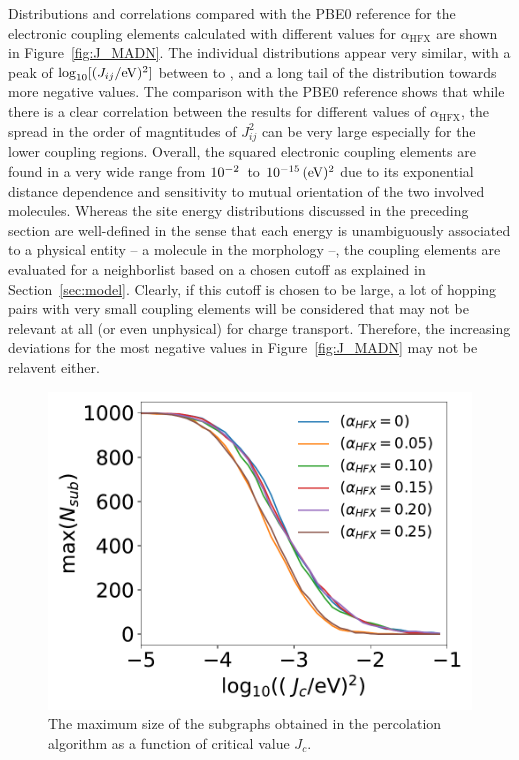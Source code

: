 \documentclass[%
 reprint,
superscriptaddress,
 amsmath,amssymb,
 aps,
prb,
floatfix
]{revtex4-2}
\newcommand{\bjoern}[2]{{\color{blue}{{\bf #1} #2}}}
\newcommand{\ahfx}{\ensuremath{\alpha_\text{HFX}}\xspace}
\begin{document}
Distributions and correlations compared with the PBE0 reference for the electronic coupling elements calculated with different values for \ahfx are shown in Figure~\ref{fig:J_MADN}. The individual distributions appear very similar, with a peak of $\log_{10}[(J_{ij}/\unit[]{eV})^2]$ between \unit[-5]{} to \unit[-6]{}, and a long tail of the distribution towards more negative values. The comparison with the PBE0 reference shows that while there is a clear correlation between the results for different values of \ahfx, the spread in the order of magntitudes of $J_{ij}^2$ can be very large especially for the lower coupling regions. Overall, the squared electronic coupling elements are found in a very wide range from $\unit[10^{-2}]{}$ to $\unit[10^{-15}]{(eV)^2}$ due to its exponential distance dependence and sensitivity to mutual orientation of the two involved molecules. Whereas the site energy distributions discussed in the preceding section are well-defined in the sense that each energy is unambiguously associated to a physical entity -- a molecule in the morphology --, the coupling elements are evaluated for a neighborlist based on a chosen cutoff as explained in Section~\ref{sec:model}.\bjoern{TODO:}{add!} Clearly, if this cutoff is chosen to be large, a lot of hopping pairs with very small coupling elements will be considered that may not be relevant at all (or even unphysical) for charge transport. Therefore, the increasing deviations for the most negative values in Figure~\ref{fig:J_MADN} may not be relavent either. 

\begin{figure}[tbp]
  \centering
  \includegraphics[width=\linewidth]{figs/fig_network_all.pdf}
  \caption{The maximum size of the subgraphs obtained in the percolation algorithm as a function of critical value $J_c$.}
  \label{fig:J_percolate}
\end{figure}
\end{document}
